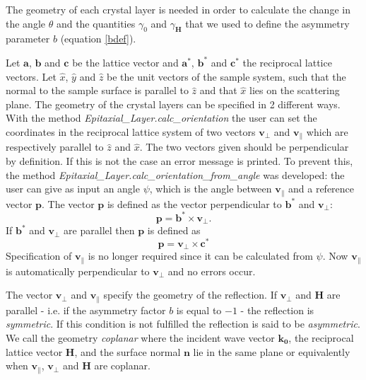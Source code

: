 \documentclass[12pt,oneside,notitlepage,abstracton,a4paper]{scrartcl}
\begin{document}
The geometry of each crystal layer is needed in order to calculate the change in the angle $\theta$ and the quantities $\gamma_0$ and $\gamma_\mathbf{H}$ that we used to define the asymmetry parameter $b$ (equation \ref{bdef}).


Let $\mathbf{a}$, $\mathbf{b}$ and $\mathbf{c}$ be the lattice vector and $\mathbf{a^*}$, $\mathbf{b^*}$ and $\mathbf{c^*}$ the reciprocal lattice vectors.
Let $\hat{x}$, $\hat{y}$ and $\hat{z}$ be the unit vectors of the sample system, such that the normal to the sample surface is parallel to $\hat{z}$ and that $\hat{x}$ lies on the scattering plane.
The geometry of the crystal layers can be specified in 2 different ways.
With the method \textit{Epitaxial\_Layer.calc\_orientation} the user can set the coordinates in the reciprocal lattice system of two vectors $\mathbf{v_\perp}$ and $\mathbf{v_\parallel}$ which are respectively parallel to $\hat{z}$ and $\hat{x}$. The two vectors given should be perpendicular by definition. If this is not the case an error message is printed. To prevent this, the method \textit{Epitaxial\_Layer.calc\_orientation\_from\_angle} was developed: the user can give as input an angle $\psi$, which is the angle between $\mathbf{v_\parallel}$ and a reference vector $\mathbf{p}$. The vector $\mathbf{p}$ is defined as the vector perpendicular to $\mathbf{b^*}$ and $\mathbf{v_\perp}$:
\begin{equation}
 \mathbf{p}=\mathbf{b^*} \times \mathbf{v_\perp}.
\end{equation}
If $\mathbf{b^*}$ and $\mathbf{v_\perp}$ are parallel then $\mathbf{p}$ is defined as
\begin{equation}
 \mathbf{p}=\mathbf{v_\perp} \times \mathbf{c^*}
\end{equation}
Specification of $\mathbf{v_\parallel}$ is no longer required since it can be calculated from $\psi$. Now $\mathbf{v_\parallel}$ is automatically perpendicular to $\mathbf{v_\perp}$ and no errors occur.

The vector $\mathbf{v_\perp}$ and $\mathbf{v_\parallel}$ specify the geometry of the reflection.
If $\mathbf{v_\perp}$ and $\mathbf{H}$ are parallel - i.e. if the asymmetry factor $b$ is equal to $-1$ - the reflection is \textit{symmetric}. If this condition is not fulfilled the reflection is said to be \textit{asymmetric}.
We call the geometry \textit{coplanar} where the incident wave vector $\mathbf{k_0}$, the reciprocal lattice vector $\mathbf{H}$, and the surface normal $\mathbf{n}$ lie in the same plane or equivalently when $\mathbf{v_\parallel}$, $\mathbf{v_\perp}$ and $\mathbf{H}$ are coplanar.
\end{document}
